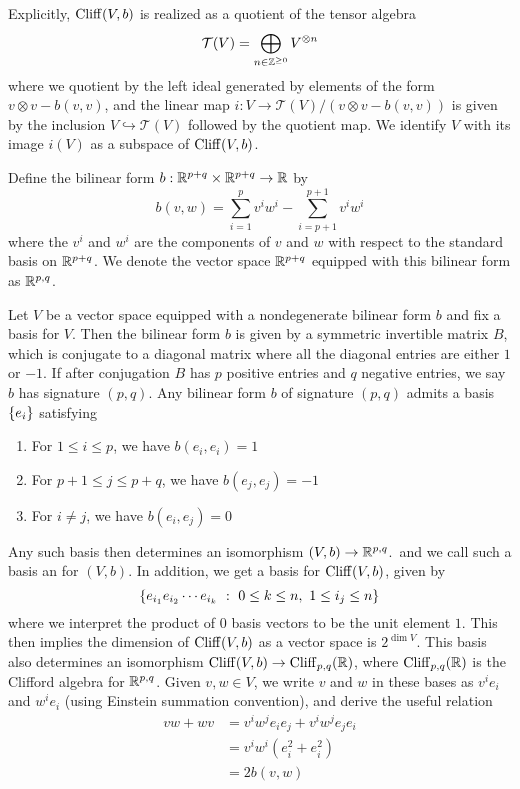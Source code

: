%
Explicitly, $\operatorname{Cliff}(V,b)$ is realized as a quotient of the tensor algebra
\[
\mathcal{T}(V) = \bigoplus_{n \in \mathbb{Z}^{\geq 0}} V^{\otimes n}
\]
where we quotient by the left ideal generated by elements of the form
$v \otimes v - b(v,v)$, and the linear map
$i: V \to \mathcal{T}(V) / (v \otimes v - b(v,v))$
is given by the inclusion $V \hookrightarrow \mathcal{T}(V)$ followed by the
quotient map. We identify $V$ with its image $i(V)$ as a subspace of $\operatorname{Cliff}(V,b)$.
%
\begin{defn}
Define the bilinear form $b : \mathbb{R}^{p+q} \times \mathbb{R}^{p+q} \to \mathbb{R}$ by
\[
b(v,w) = \sum_{i = 1}^{p} v^iw^i - \sum_{i = p+1}^{p+1} v^iw^i
\]
where the $v^i$ and $w^i$ are the components of $v$ and $w$ with respect to
the standard basis on $\mathbb{R}^{p+q}$. We denote the vector space $\mathbb{R}^{p+q}$
equipped with this bilinear form as $\mathbb{R}^{p,q}$.
\end{defn}
%
Let $V$ be a vector space equipped with a nondegenerate bilinear form $b$ and
fix a basis for $V$. Then the bilinear form $b$ is given by a symmetric
invertible matrix $B$, which is conjugate to a diagonal matrix where all
the diagonal entries are either $1$ or $-1$. If after conjugation $B$ has
$p$ positive entries and $q$ negative entries, we say $b$ has signature $(p,q)$.
Any bilinear form $b$ of signature $(p,q)$ admits a basis $\left\lbrace e_i \right\rbrace$ satisfying
%
\begin{enumerate}
  \item For $1 \leq i \leq p$, we have $b(e_i,e_i) = 1$
  \item For $p+1 \leq j \leq p+q$, we have $b(e_j,e_j) = -1$
  \item For $i \neq j$, we have $b(e_i,e_j) = 0$
\end{enumerate}
%
Any such basis then determines an isomorphism $(V,b) \to \mathbb{R}^{p,q}$.\, and we
call such a basis an  for $(V,b)$.
In addition, we get a basis for $\operatorname{Cliff}(V,b)$, given by
\[
\left\lbrace e_{i_1}e_{i_2}\cdots e_{i_k}~:~ 0 \leq k \leq n, ~ 1 \leq i_j \leq n \right\rbrace
\]
where we interpret the product of $0$ basis vectors to be the unit element $1$.
This then implies the dimension of $\operatorname{Cliff}(V,b)$ as a vector space is
$2^{\dim V}$. This basis also determines an isomorphism
$\operatorname{Cliff}(V,b) \to \operatorname{Cliff}_{p,q}(\mathbb{R})$, where $\operatorname{Cliff}_{p,q}(\mathbb{R})$ is the Clifford
algebra for $\mathbb{R}^{p,q}$. Given $v,w \in V$, we write $v$ and $w$ in these
bases as $v^ie_i$ and $w^ie_i$ (using Einstein summation convention),
and derive the useful relation
%
\begin{align*}
vw + wv &= v^iw^je_ie_j + v^iw^je_je_i \\
&= v^iw^i(e_i^2 + e_i^2) \\
&= 2b(v,w)
\end{align*}
